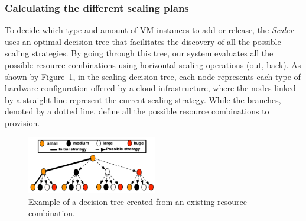 

\subsubsection{Calculating the different scaling plans}

To decide which type and amount of VM instances to add or release, the \emph{Scaler} uses an optimal decision tree that facilitates the discovery of all the possible scaling strategies. By going through this tree, our system evaluates all the possible resource combinations using horizontal scaling operations (out, back). As shown by Figure~\ref{fig:scalingTree}, in the scaling decision tree, each node represents each type of hardware configuration offered by a cloud infrastructure, where the nodes linked by a straight line represent the current scaling strategy. While the branches, denoted by a dotted line, define all the possible resource combinations to provision. 

\begin{figure}[t]
  \begin{center}
    \includegraphics[width=0.7\linewidth,height=2.5cm]{images/optimalTree_initial}
  \end{center}
\vspace{-4mm}
  \caption{Example of a decision tree created from an existing resource combination.}
  \label{fig:scalingTree}
\end{figure}

